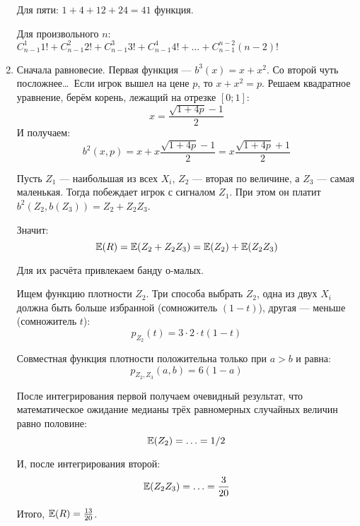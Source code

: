 \begin{enumerate}
Для пяти: $1+4+12+24=41$ функция.

Для произвольного $ n $: $ C_{n-1}^{1}1!+C_{n-1}^{2}2!+C_{n-1}^{3}3!+C_{n-1}^{4}4!+\ldots +C_{n-1}^{n-2}(n-2)! $


\item Сначала равновесие. Первая функция — $ b^{3}(x)=x+x^{2} $. Со второй чуть посложнее\ldots~Если игрок вышел на цене $ p $, то $ x+x^{2}=p $. Решаем квадратное уравнение, берём корень, лежащий на отрезке $ [0;1] $:
\begin{equation}
x=\frac{\sqrt{1+4p}-1}{2}
\end{equation}
И получаем:
\begin{equation}
b^{2}(x,p)=x+x\frac{\sqrt{1+4p}-1}{2}=x\frac{\sqrt{1+4p}+1}{2}
\end{equation}

Пусть $ Z_{1} $ — наибольшая из всех $ X_{i} $, $ Z_{2} $ — вторая по величине, а $ Z_{3} $ — самая маленькая. Тогда побеждает игрок с сигналом $ Z_{1} $. При этом он платит $ b^{2}(Z_{2},b(Z_{3}))=Z_{2}+Z_{2}Z_{3} $.

Значит:
\begin{equation}
\operatorname{\mathbb{E}}(R)=\operatorname{\mathbb{E}}(Z_{2}+Z_{2}Z_{3})=\operatorname{\mathbb{E}}(Z_{2})+\operatorname{\mathbb{E}}(Z_{2}Z_{3})
\end{equation}

Для их расчёта привлекаем банду о-малых.


Ищем функцию плотности $ Z_{2} $. Три способа выбрать $ Z_{2} $, одна из двух $ X_{i} $ должна быть больше избранной (сомножитель $ (1-t) $), другая — меньше (сомножитель $ t $):
\begin{equation}
p_{Z_{2}}(t)=3\cdot 2\cdot t(1-t)
\end{equation}

Совместная функция плотности положительна только при $ a>b $ и равна:
\begin{equation}
p_{Z_{2},Z_{3}}(a,b)=6(1-a)
\end{equation}

После интегрирования первой получаем очевидный результат, что математическое ожидание медианы трёх равномерных случайных величин равно половине:
\begin{equation}
\operatorname{\mathbb{E}}(Z_{2})=\ldots=1/2
\end{equation}

И, после интегрирования второй:
\begin{equation}
\operatorname{\mathbb{E}}(Z_{2}Z_{3})=\ldots=\frac{3}{20}
\end{equation}

Итого, $ \operatorname{\mathbb{E}}(R)=\frac{13}{20} $.


\end{enumerate}
